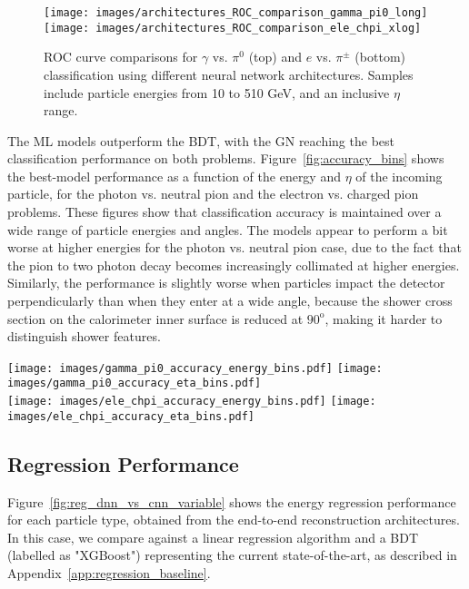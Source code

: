 \begin{figure}[htbp]
\centering
\texttt{[image: images/architectures\_ROC\_comparison\_gamma\_pi0\_long]}
\texttt{[image: images/architectures\_ROC\_comparison\_ele\_chpi\_xlog]}
\caption{ROC curve comparisons for $\gamma$ vs. $\pi^0$ (top) and $e$ vs. $\pi^\pm$ (bottom) classification using different neural network architectures. Samples include particle energies from 10 to 510 GeV, and an inclusive $\eta$ range.}
\label{fig:architectures_ROC_comparisons}
\end{figure}

The ML models outperform the BDT, with the GN reaching the best classification performance on both problems. Figure~\ref{fig:accuracy_bins} shows the best-model performance as a function of the energy and $\eta$ of the incoming particle, for the photon vs. neutral pion and the electron vs. charged pion problems. These figures show that classification accuracy is maintained over a wide range of particle energies and angles. The models appear to perform a bit worse at higher energies for the photon vs. neutral pion case, due to the fact that the pion to two photon decay becomes increasingly collimated at higher energies. Similarly, the performance is slightly worse when particles impact the detector perpendicularly than when they enter at a wide angle, because the shower cross section on the calorimeter inner surface is reduced at $90^{\mathrm o}$, making it harder to distinguish shower features.

\begin{figure*}[htbp]
\centering
\texttt{[image: images/gamma\_pi0\_accuracy\_energy\_bins.pdf]}
\texttt{[image: images/gamma\_pi0\_accuracy\_eta\_bins.pdf]} \\
\texttt{[image: images/ele\_chpi\_accuracy\_energy\_bins.pdf]}
\texttt{[image: images/ele\_chpi\_accuracy\_eta\_bins.pdf]}
\caption{Classification accuracy of best performing network for $\gamma$ vs. $\pi^0$ (top) and $e$ vs. $\pi^\pm$ (bottom), in bins of energy (left) and $\eta$ (right).}
\label{fig:accuracy_bins}
\end{figure*}


\subsection{Regression Performance}
\label{sec:regression}

Figure~\ref{fig:reg_dnn_vs_cnn_variable} shows the energy regression performance for each particle type, obtained from the end-to-end reconstruction architectures. In this case, we compare against a linear regression algorithm and a BDT (labelled as "XGBoost") representing the current state-of-the-art, as described in Appendix~\ref{app:regression_baseline}. 

